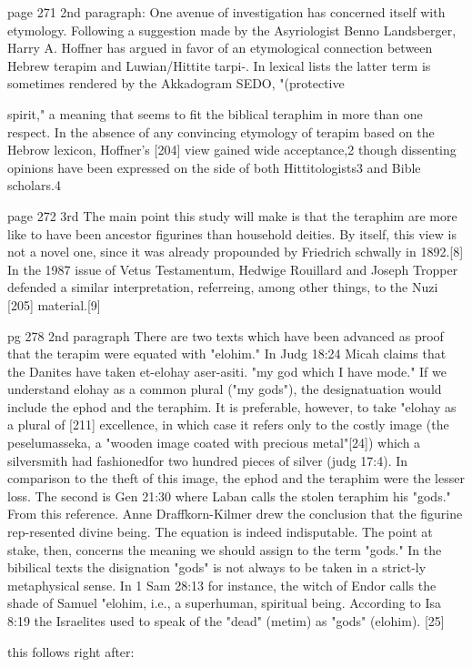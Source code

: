 \documentclass[11pt]{article}
\begin{document}
page 271 2nd paragraph:
One avenue of investigation has concerned itself with etymology. Following a suggestion made by the Asyriologist Benno Landsberger, Harry A. Hoffner has argued in favor of an etymological connection between Hebrew terapim and Luwian/Hittite tarpi-. In lexical lists the latter term is sometimes rendered by the Akkadogram SEDO, "(protective{ spirit," a meaning that seems to fit the biblical teraphim in more than one respect. In the absence of any convincing etymology of terapim based on the Hebrow lexicon, Hoffner's [204] view gained wide acceptance,2 though dissenting opinions have been expressed on the side of both Hittitologists3 and Bible scholars.4

page 272 3rd
The main point this study will make is that the teraphim are more like to have been ancestor figurines than household deities. By itself, this view is not a novel one, since it was already propounded by Friedrich schwally in 1892.[8] In the 1987 issue of Vetus Testamentum, Hedwige Rouillard and Joseph Tropper defended a similar interpretation, referreing, among other things, to the Nuzi [205] material.[9]

pg 278 2nd paragraph
There are two texts which have been advanced as proof that the terapim were equated with "elohim." In Judg 18:24 Micah claims that the Danites have taken et-elohay aser-asiti. "my god which I have mode." If we understand elohay as a common plural ("my gods"), the designatuation would include the ephod and the teraphim. It is preferable, however, to take "elohay as a plural of [211] excellence, in which case it refers only to the costly image (the peselumasseka, a "wooden image coated with precious metal"[24]) which a silversmith had fashionedfor two hundred pieces of silver (judg 17:4). In comparison to the theft of this image, the ephod and the teraphim were the lesser loss. The second is Gen 21:30 where Laban calls the stolen teraphim his "gods." From this reference. Anne Draffkorn-Kilmer drew the conclusion that the figurine rep-resented divine being. The equation is indeed indisputable. The point at stake, then, concerns the meaning we should assign to the term "gods."
In the bibilical texts the disignation "gods" is not always to be taken in a strict-ly metaphysical sense. In 1 Sam 28:13 for instance, the witch of Endor calls the shade of Samuel "elohim, i.e., a superhuman, spiritual being. According to Isa 8:19 the Israelites used to speak of the "dead" (metim) as "gods" (elohim). [25]

this follows right after:

}
\end{document}
